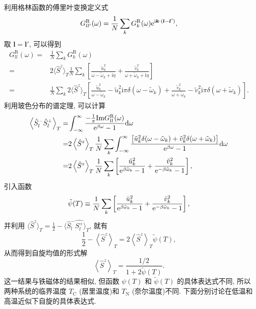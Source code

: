 利用格林函数的傅里叶变换定义式
\begin{equation}
    G_{ll'}^{\mathrm{R}}(\omega)=\frac{1}{N}\sum_k G_k^{\mathrm{R}}(\omega)\mathrm{e}^{\mathrm{i}\boldsymbol{k}\cdot(\boldsymbol{l}-\boldsymbol{l}')},
\end{equation}
取 $\boldsymbol{l}=\boldsymbol{l}'$, 可以得到
\begin{align}
        G_{ll}^{\mathrm{R}}(\omega)=&\frac{1}{N}\sum_kG_k^{\mathrm{R}}(\omega)\nonumber\\
        =&2\langle \hat{S}^z \rangle_T\frac{1}{N}\sum_k\left[ \frac{\tilde{u}_k^2}{\omega-\tilde{\omega}_k+\mathrm{i}\eta} +\frac{\tilde{v}_k^2}{\omega+\tilde{\omega}_k+\mathrm{i}\eta}\right]\nonumber\\
        =&\frac{1}{N}\sum_k 2\langle \hat{S}^z \rangle_T\left[ \frac{\tilde{u}_k^2}{\omega-\tilde{\omega}_k}-\tilde{u}_k^2\mathrm{i}\pi\delta(\omega-\tilde{\omega}_k)+\frac{\tilde{v}_k^2}{\omega+\tilde{\omega}_k}-\tilde{v}_k^2\mathrm{i}\pi\delta(\omega+\tilde{\omega}_k) \right].
    \end{align}
利用玻色分布的谱定理, 可以计算 
    \begin{align}
        \left\langle \hat{S}_l^-\hat{S}_l^+ \right\rangle_T=&\int_{-\infty}^\infty\frac{-\frac{1}{\pi}\mathrm{Im}G_{ll}^{\mathrm{R}}(\omega)}{\mathrm{e}^{\beta\omega}-1}\mathrm{d} \omega\nonumber\\
        =&2\left\langle \hat{S}^z \right\rangle_T\frac{1}{N}\sum_k\int_{-\infty}^\infty\frac{\left[ \tilde{u}_k^2\delta(\omega-\tilde{\omega}_k)+\tilde{v}_k^2\delta(\omega+\tilde{\omega}_k) \right]}{\mathrm{e}^{\beta\omega}-1}\mathrm{d}\omega\nonumber\\
        =&2\left\langle \hat{S}^z \right\rangle_T\frac{1}{N}\sum_k\left[ \frac{\tilde{u}_k^2}{\mathrm{e}^{\beta\tilde{\omega}_k}-1}+\frac{\tilde{v}_k^2}{\mathrm{e}^{-\beta\tilde{\omega}_k}-1} \right],
    \end{align}
引入函数 
\begin{equation}
    \tilde{\psi}(T)\equiv \frac{1}{N}\sum_k\left[ \frac{\tilde{u}_k^2}{\mathrm{e}^{\beta\tilde{\omega}_k}-1}+\frac{\tilde{v}_k^2}{\mathrm{e}^{-\beta\tilde{\omega}_k}-1} \right],
\end{equation}
并利用 $\langle \hat{S}^z \rangle_T=\frac{1}{2}-\langle \hat{S}_l^-\hat{S_l^+} \rangle_T$, 就有
\begin{equation}
    \frac{1}{2}-\left\langle \hat{S}^z \right\rangle_T=2\left\langle \hat{S}^z \right\rangle_T\tilde{\psi}(T),
\end{equation}
从而得到自旋均值的形式解
\begin{equation}
    \left\langle \hat{S}^z \right\rangle_T=\frac{1/2}{1+2\tilde{\psi}(T)}.
    \label{antiferro-Sz}
\end{equation}
这一结果与铁磁体的结果相似, 但函数 $\psi(T)$ 和 $\tilde{\psi}(T)$ 的具体表达式不同, 所以两种系统的临界温度 $T_{\mathrm{C}}$ (居里温度)和 $T_{\mathrm{N}}$ (奈尔温度)不同. 下面分别讨论在低温和高温近似下自旋的具体表达式.

